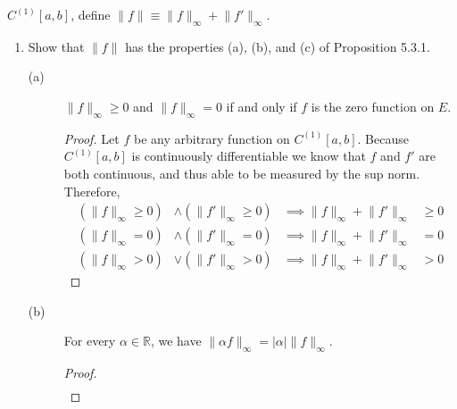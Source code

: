 \documentclass{article}
\begin{document}
\begin{enumerate}
            $C^{(1)}[a,b]$, define $\lVert f\rVert \equiv \lVert f\rVert_\infty
                  + \lVert f'\rVert_\infty$.
            \begin{enumerate}
                  \item Show that $\lVert f\rVert$ has the properties (a), (b),
                        and (c) of Proposition 5.3.1.
                        \begin{description}
                              \item[(a)] $\lVert f\rVert_\infty\geq 0$ and
                                    $\lVert f\rVert_\infty=0$ if and only if $f$
                                    is the zero function on $E$.
                                    \begin{proof}
                                          Let $f$ be any arbitrary function on
                                          $C^{(1)}[a,b]$. Because $C^{(1)}[a,b]$
                                          is continuously differentiable we know
                                          that $f$ and $f'$ are both continuous,
                                          and thus able to be measured by the sup
                                          norm. Therefore,
                                          \begin{align*}
                                                (\lVert f\rVert_\infty \geq 0) & \land (\lVert f'\rVert_\infty  \geq 0) & \implies\lVert f\rVert_\infty + \lVert f'\rVert_\infty & \geq 0 \\
                                                (\lVert f\rVert_\infty = 0)    & \land (\lVert f'\rVert_\infty  = 0)    & \implies\lVert f\rVert_\infty + \lVert f'\rVert_\infty & = 0    \\
                                                (\lVert f\rVert_\infty > 0)    & \lor (\lVert f'\rVert_\infty  > 0)     & \implies\lVert f\rVert_\infty + \lVert f'\rVert_\infty & > 0
                                          \end{align*}
                                    \end{proof}
                              \item[(b)] For every $\alpha\in\mathbb{R}$, we have
                                    $\lVert\alpha f\rVert_\infty=\lvert\alpha\rvert\lVert f\rVert_\infty$.
                                    \begin{proof}
                                          \begin{align*}

\end{align*}
\end{proof}
\end{description}
\end{enumerate}
\end{enumerate}
\end{document}
